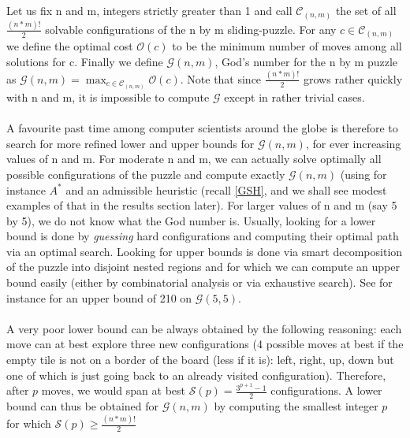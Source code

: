 Let us fix n and m, integers strictly greater than 1 and call $\mathcal{C}_{(n, m)}$ the set of all $\frac{(n * m)!}{2}$ solvable configurations of the n by m sliding-puzzle. For any $c \in \mathcal{C}_{(n, m)}$ we define the optimal cost $\mathcal{O}(c)$ to be the minimum number of moves among all solutions for c. Finally we define $\mathcal{G}(n, m)$, God's number for the n by m puzzle as  $\mathcal{G}(n, m) = \max_{c \in \mathcal{C}_{(n, m)}} \mathcal{O}(c)$. Note that since $\frac{(n * m)!}{2}$ grows rather quickly with n and m, it is impossible to compute $\mathcal{G}$ except in rather trivial cases.
\\
\\
A favourite past time among computer scientists around the globe is therefore to search for more refined lower and upper bounds for $\mathcal{G}(n, m)$, for ever increasing values of n and m. For moderate n and m, we can actually solve optimally all possible configurations of the puzzle and compute exactly $\mathcal{G}(n, m)$  (using for instance $A^{*}$ and an admissible heuristic (recall \ref{GSH}, and we shall see modest examples of that in the results section later). For larger values of n and m (say 5 by 5), we do not know what the God number is. Usually, looking for a lower bound is done by \textit{guessing} hard configurations and computing their optimal path via an optimal search. Looking for upper bounds is done via smart decomposition of the puzzle into disjoint nested regions and for which we can compute an upper bound easily (either by combinatorial analysis or via exhaustive search). See for instance \cite{KarlemoOstergard} for an upper bound of 210 on $\mathcal{G}(5, 5)$.
\\
\\
A very poor lower bound can be always obtained by the following reasoning: each move can at best explore three new configurations (4 possible moves at best if the empty tile is not on a border of the board (less if it is): left, right, up, down but one of which is just going back to an already visited configuration). Therefore, after $p$ moves, we would span at best $\mathcal{S}(p) = \frac{3^{p+1} - 1}{2}$ configurations. A lower bound can thus be obtained for $\mathcal{G}(n, m)$ by computing the smallest integer $p$ for which $\mathcal{S}(p) \ge \frac{(n * m)!}{2}$





